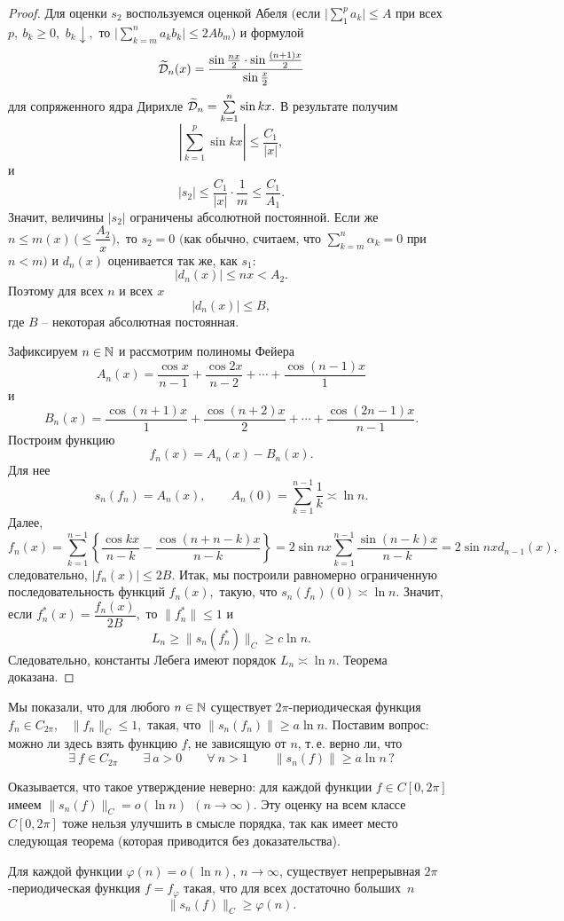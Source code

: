 \begin{proof}
Для оценки $s_2$ воспользуемся оценкой Абеля $\Big($если $\Big| \sum\limits_1^{p} a_k\Big| \le
A$ при всех $p,\ b_k\ge 0,$ $b_k\downarrow,$ то $\Big|
\sum\limits_{{k=m}}^n a_k b_k \Big|\le 2{Ab_m }\Big)$ {и формулой }
$$
 \widetilde{\mathcal{D}}_n(x)=
\frac{\sin\frac{nx}{2}\cdot\sin\frac{(n+1)x}{2}}{\sin\frac{x}{2}}
$$
для сопряженного ядра Дирихле $\widetilde{\mathcal{D}}_n=\sum\limits_{k=1}^n\sin kx.$
В результате получим
$$
\left| \sum\limits_{k=1}^p \sin kx \right|\le \dfrac{C_1}{|x|},
$$
и
$$
|s_2|\le \frac{C_{{1}}}{|x|}\cdot\frac{1}{m}{\le \frac{C_1}{A_1}}.
$$
Значит, величины $|s_2|$ ограничены абсолютной постоянной. {Если же} {$n\le m(x)\,
\Big(\le \dfrac{A_2}{x} \Big),$ то $s_2=0$ $\Big($как обычно, считаем, что
$\sum\limits_{k=m}^n{\alpha_k}=0$ при $n<m\Big)$
и $d_n(x)$ оценивается так же, как $s_1$:}
$$
{|d_n(x)|\le nx< A_2.}
$$
Поэтому для всех $n$ и всех $x$
$$
|d_n(x)|\le {B},
$$
где $B$ -- некоторая абсолютная постоянная.

Зафиксируем $n\in \mathbb{N}$ и рассмотрим полиномы Фейера
$$
A_n(x)=\frac{\cos x}{n-1}+\frac{\cos 2x}{n-2}+\cdots+ \frac{\cos(n-1)x}{1}
$$
и
$$
B_n(x)=\frac{\cos (n+1)x}{1}+\frac{\cos (n+2)x}{2}+\cdots+
\frac{\cos(2n-1)x}{n-1}.
$$
Построим функцию\label{l5-A_n-B_n}
$$
f_n(x)=A_n(x)-B_n(x).
$$
Для нее
$$
s_n(f_n)=A_n(x),\qquad A_n(0)=\sum\limits_{k=1}^{n-1} \frac{1}{k} \asymp \ln
n.
$$
Далее,
$$
f_n(x)=\sum\limits_{k=1}^{n-1} \left\{ \frac{\cos kx}{n-k}-\frac{\cos
(n+n-k)x}{n-k} \right\}
=2\sin nx \sum\limits_{k=1}^{n-1} \frac{\sin (n-k)x}{n-k}=2\sin nxd_{n-1}(x),
$$
следовательно, {$|f_n(x)|\le 2B.$} Итак, мы построили
равномерно ограниченную последовательность функций $f_n(x),$ такую, что
$s_n(f_n)(0)\asymp \ln n.$
Значит, если ${f_n^*}(x)=\dfrac{f_n(x)}{2B},$ то $\|{f_n^*}\| \le 1$ и
$$
L_n\ge \|s_n(f_n^*)\|_C\ge c\ln n.
$$
Следовательно, константы Лебега имеют порядок $L_n \asymp \ln n.$ Теорема доказана.
\end{proof}

Мы показали, что для любого {$n\in\mathbb{N}$} существует {$2\pi$-периодическая}
функция {$f_n\in C_{2\pi},$~ $\|f_n\|_C\le 1,$} такая, что
$\|s_n(f_n)\|\ge a\ln n.$ Поставим вопрос: можно ли здесь взять функцию
$f$, не зависящую от $n$, т.\,е. верно ли, что
$$
\exists\ f\in C_{2\pi}\qquad \exists\ a>0\qquad \forall\ n>1\qquad \|s_n(f)\|\ge a\ln n\,?
$$


Оказывается, что такое утверждение неверно: для каждой функции {$f\in C[0,2\pi]$}
имеем {$\|s_n(f)\|_C=o(\ln n)\ \ (n\rightarrow\infty).$ Эту оценку на всем классе
$C[0,2\pi]$ тоже нельзя} {улучшить в смысле порядка, так как} имеет место
{следующая} теорема (которая приводится без доказательства).
\begin{teo}[Д.\,Е.\,Меньшов]
Для каждой функции $\varphi(n)=o(\ln n)$, $n\rightarrow \infty$, существует непрерывная
$2\pi$-периодическая
функция $f=f_{\varphi}$ такая, что для всех достаточно больших~$n$
$$
\|s_n(f)\|_C\ge \varphi(n).
$$
\end{teo}

